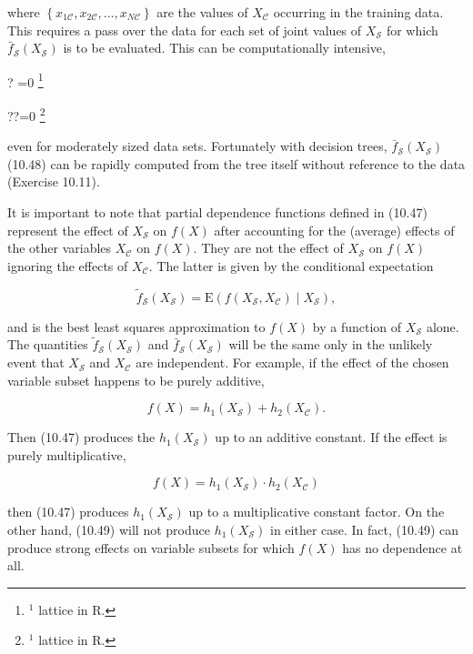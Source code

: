 \documentclass[10pt]{article}
\let\svthefootnote\thefootnote
\newcommand\blfootnotetext[1]{%
  \let\thefootnote\relax\footnote{#1}%
  \addtocounter{footnote}{-1}%
  \let\thefootnote\svthefootnote%
}
\let\svfootnotetext\footnotetext
\renewcommand\footnotetext[2][?]{%
  \if\relax#1\relax%
    \ifnum\value{footnote}=0\blfootnotetext{#2}\else\svfootnotetext{#2}\fi%
  \else%
    \if?#1\ifnum\value{footnote}=0\blfootnotetext{#2}\else\svfootnotetext{#2}\fi%
    \else\svfootnotetext[#1]{#2}\fi%
  \fi
}
\begin{document}
where $\left\{x_{1 \mathcal{C}}, x_{2 \mathcal{C}}, \ldots, x_{N \mathcal{C}}\right\}$ are the values of $X_{\mathcal{C}}$ occurring in the training data. This requires a pass over the data for each set of joint values of $X_{\mathcal{S}}$ for which $\bar{f}_{\mathcal{S}}\left(X_{\mathcal{S}}\right)$ is to be evaluated. This can be computationally intensive,

even for moderately sized data sets. Fortunately with decision trees, $\bar{f}_{\mathcal{S}}\left(X_{\mathcal{S}}\right)$ (10.48) can be rapidly computed from the tree itself without reference to the data (Exercise 10.11).

It is important to note that partial dependence functions defined in (10.47) represent the effect of $X_{\mathcal{S}}$ on $f(X)$ after accounting for the (average) effects of the other variables $X_{\mathcal{C}}$ on $f(X)$. They are not the effect of $X_{\mathcal{S}}$ on $f(X)$ ignoring the effects of $X_{\mathcal{C}}$. The latter is given by the conditional expectation


\begin{equation*}
\tilde{f}_{\mathcal{S}}\left(X_{\mathcal{S}}\right)=\mathrm{E}\left(f\left(X_{\mathcal{S}}, X_{\mathcal{C}}\right) \mid X_{\mathcal{S}}\right), \tag{10.49}
\end{equation*}


and is the best least squares approximation to $f(X)$ by a function of $X_{\mathcal{S}}$ alone. The quantities $\tilde{f}_{\mathcal{S}}\left(X_{\mathcal{S}}\right)$ and $\bar{f}_{\mathcal{S}}\left(X_{\mathcal{S}}\right)$ will be the same only in the unlikely event that $X_{\mathcal{S}}$ and $X_{\mathcal{C}}$ are independent. For example, if the effect of the chosen variable subset happens to be purely additive,


\begin{equation*}
f(X)=h_{1}\left(X_{\mathcal{S}}\right)+h_{2}\left(X_{\mathcal{C}}\right) . \tag{10.50}
\end{equation*}


Then (10.47) produces the $h_{1}\left(X_{\mathcal{S}}\right)$ up to an additive constant. If the effect is purely multiplicative,


\begin{equation*}
f(X)=h_{1}\left(X_{\mathcal{S}}\right) \cdot h_{2}\left(X_{\mathcal{C}}\right) \tag{10.51}
\end{equation*}


then (10.47) produces $h_{1}\left(X_{\mathcal{S}}\right)$ up to a multiplicative constant factor. On the other hand, (10.49) will not produce $h_{1}\left(X_{\mathcal{S}}\right)$ in either case. In fact, (10.49) can produce strong effects on variable subsets for which $f(X)$ has no dependence at all.
\end{document}
